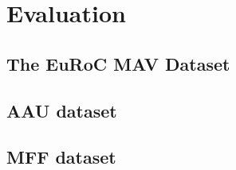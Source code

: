 \chapter{Evaluation}
\label{chap:evaluation}

\section{The EuRoC MAV Dataset}
\label{sec:euroc-dataset}

\section{AAU dataset}
\label{sec:aau-dataset}

\section{MFF dataset}
\label{sec:mff-dataset}